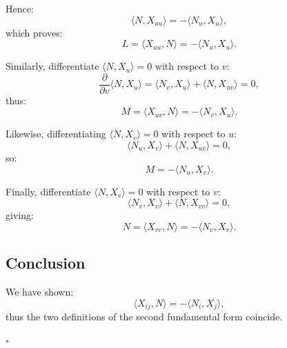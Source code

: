 \documentclass[11pt]{article}
\begin{document}
	Hence:
	\[
	\langle N, X_{uu} \rangle = - \langle N_u, X_u \rangle,
	\]
	which proves:
	\[
	L = \langle X_{uu}, N \rangle = -\langle N_u, X_u \rangle.
	\]
	
	Similarly, differentiate $\langle N, X_u \rangle = 0$ with respect to $v$:
	\[
	\frac{\partial}{\partial v} \langle N, X_u \rangle
	= \langle N_v, X_u \rangle + \langle N, X_{uv} \rangle = 0,
	\]
	thus:
	\[
	M = \langle X_{uv}, N \rangle = -\langle N_v, X_u \rangle.
	\]
	
	Likewise, differentiating $\langle N, X_v \rangle = 0$ with respect to $u$:
	\[
	\langle N_u, X_v \rangle + \langle N, X_{uv} \rangle = 0,
	\]
	so:
	\[
	M = -\langle N_u, X_v \rangle.
	\]
	
	Finally, differentiate $\langle N, X_v \rangle = 0$ with respect to $v$:
	\[
	\langle N_v, X_v \rangle + \langle N, X_{vv} \rangle = 0,
	\]
	giving:
	\[
	N = \langle X_{vv}, N \rangle = -\langle N_v, X_v \rangle.
	\]
	
	\subsection*{Conclusion}
	
	We have shown:
	\[
	\langle X_{ij}, N \rangle = -\langle N_i, X_j \rangle,
	\]
	thus the two definitions of the second fundamental form coincide.
	
	\hfill $\square$
	
\end{document}
